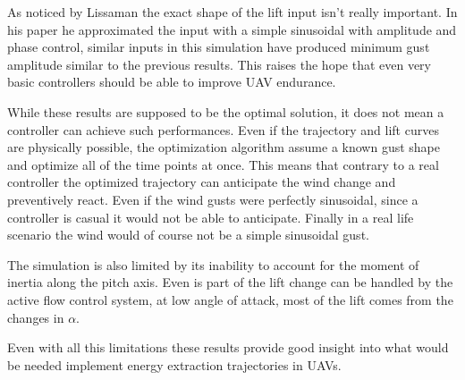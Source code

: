 \FloatBarrier
{}
As noticed by Lissaman the exact shape of the lift input isn't really important.
In his paper he approximated the input with a simple sinusoidal with amplitude and phase control, similar inputs in this simulation have produced minimum gust amplitude similar to the previous results.
This raises the hope that even very basic controllers should be able to improve UAV endurance.


\par While these results are supposed to be the optimal solution, it does not mean a controller can achieve such performances.
Even if the trajectory and lift curves are physically possible, the optimization algorithm assume a known gust shape and optimize all of the time points at once.
This means that contrary to a real controller the optimized trajectory can anticipate the wind change and preventively react.
Even if the wind gusts were perfectly sinusoidal, since a controller is casual it would not be able to anticipate.
Finally in a real life scenario the wind would of course not be a simple sinusoidal gust.

\par The simulation is also limited by its inability to account for the moment of inertia along the pitch axis.
Even is part of the lift change can be handled by the active flow control system, at low angle of attack, most of the lift comes from the changes in $\alpha$.

\par Even with all this limitations these results provide good insight into what would be needed implement energy extraction trajectories in UAVs.


